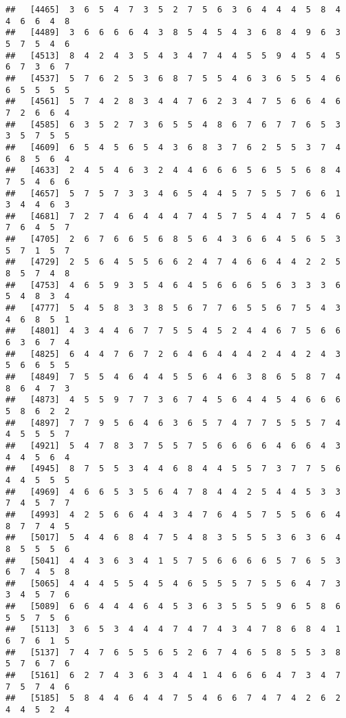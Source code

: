 \documentclass[
]{book}
\begin{document}
\begin{verbatim}
##   [4465]  3  6  5  4  7  3  5  2  7  5  6  3  6  4  4  4  5  8  4  4  6  6  4  8
##   [4489]  3  6  6  6  6  4  3  8  5  4  5  4  3  6  8  4  9  6  3  5  7  5  4  6
##   [4513]  8  4  2  4  3  5  4  3  4  7  4  4  5  5  9  4  5  4  5  6  7  3  6  7
##   [4537]  5  7  6  2  5  3  6  8  7  5  5  4  6  3  6  5  5  4  6  6  5  5  5  5
##   [4561]  5  7  4  2  8  3  4  4  7  6  2  3  4  7  5  6  6  4  6  7  2  6  6  4
##   [4585]  6  3  5  2  7  3  6  5  5  4  8  6  7  6  7  7  6  5  3  3  5  7  5  5
##   [4609]  6  5  4  5  6  5  4  3  6  8  3  7  6  2  5  5  3  7  4  6  8  5  6  4
##   [4633]  2  4  5  4  6  3  2  4  4  6  6  6  5  6  5  5  6  8  4  7  5  4  6  6
##   [4657]  5  7  5  7  3  3  4  6  5  4  4  5  7  5  5  7  6  6  1  3  4  4  6  3
##   [4681]  7  2  7  4  6  4  4  4  7  4  5  7  5  4  4  7  5  4  6  7  6  4  5  7
##   [4705]  2  6  7  6  6  5  6  8  5  6  4  3  6  6  4  5  6  5  3  5  7  1  5  7
##   [4729]  2  5  6  4  5  5  6  6  2  4  7  4  6  6  4  4  2  2  5  8  5  7  4  8
##   [4753]  4  6  5  9  3  5  4  6  4  5  6  6  6  5  6  3  3  3  6  5  4  8  3  4
##   [4777]  5  4  5  8  3  3  8  5  6  7  7  6  5  5  6  7  5  4  3  4  6  8  5  1
##   [4801]  4  3  4  4  6  7  7  5  5  4  5  2  4  4  6  7  5  6  6  6  3  6  7  4
##   [4825]  6  4  4  7  6  7  2  6  4  6  4  4  4  2  4  4  2  4  3  5  6  6  5  5
##   [4849]  7  5  5  4  6  4  4  5  5  6  4  6  3  8  6  5  8  7  4  8  6  4  7  3
##   [4873]  4  5  5  9  7  7  3  6  7  4  5  6  4  4  5  4  6  6  6  5  8  6  2  2
##   [4897]  7  7  9  5  6  4  6  3  6  5  7  4  7  7  5  5  5  7  4  4  5  5  5  7
##   [4921]  5  4  7  8  3  7  5  5  7  5  6  6  6  6  4  6  6  4  3  4  4  5  6  4
##   [4945]  8  7  5  5  3  4  4  6  8  4  4  5  5  7  3  7  7  5  6  4  4  5  5  5
##   [4969]  4  6  6  5  3  5  6  4  7  8  4  4  2  5  4  4  5  3  3  7  4  5  7  7
##   [4993]  4  2  5  6  6  4  4  3  4  7  6  4  5  7  5  5  6  6  4  8  7  7  4  5
##   [5017]  5  4  4  6  8  4  7  5  4  8  3  5  5  5  3  6  3  6  4  8  5  5  5  6
##   [5041]  4  4  3  6  3  4  1  5  7  5  6  6  6  6  5  7  6  5  3  6  7  4  5  8
##   [5065]  4  4  4  5  5  4  5  4  6  5  5  5  7  5  5  6  4  7  3  3  4  5  7  6
##   [5089]  6  6  4  4  4  6  4  5  3  6  3  5  5  5  9  6  5  8  6  5  5  7  5  6
##   [5113]  3  6  5  3  4  4  4  7  4  7  4  3  4  7  8  6  8  4  1  6  7  6  1  5
##   [5137]  7  4  7  6  5  5  6  5  2  6  7  4  6  5  8  5  5  3  8  5  7  6  7  6
##   [5161]  6  2  7  4  3  6  3  4  4  1  4  6  6  6  4  7  3  4  7  7  5  7  4  6
##   [5185]  5  8  4  4  6  4  4  7  5  4  6  6  7  4  7  4  2  6  2  4  4  5  2  4

\end{verbatim}
\end{document}
